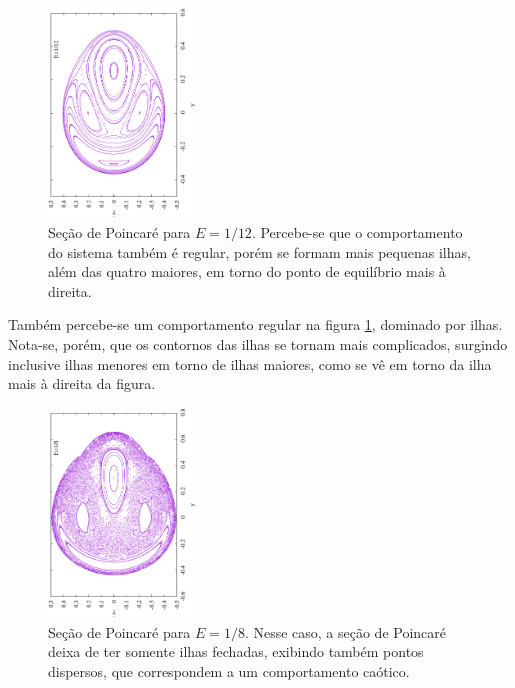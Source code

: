 \documentclass[brazilian, 10pt, a4paper, final]{article}
\begin{document}
\begin{multicols*}{2}
\begin{figure}[H]
  \centering
  \includegraphics[width=0.35\textwidth,angle=-90]{P008333.eps}
  \caption{Seção de Poincaré para $E=1/12$. Percebe-se que o comportamento do sistema também é regular, porém se formam mais pequenas ilhas, além das quatro maiores, em torno do ponto de equilíbrio mais à direita.}
  \label{fig:E12}
\end{figure}

Também percebe-se um comportamento regular na figura \ref{fig:E12}, dominado por ilhas. Nota-se, porém, que os contornos das ilhas se tornam mais complicados, surgindo inclusive ilhas menores em torno de ilhas maiores, como se vê em torno da ilha mais à direita da figura.

\begin{figure}[H]
  \centering
  \includegraphics[width=0.35\textwidth,angle=-90]{P012500.eps}
  \caption{Seção de Poincaré para $E=1/8$. Nesse caso, a seção de Poincaré deixa de ter somente ilhas fechadas, exibindo também pontos dispersos, que correspondem a um comportamento caótico.}
  \label{fig:E8}
\end{figure}


\end{multicols*}
\end{document}
